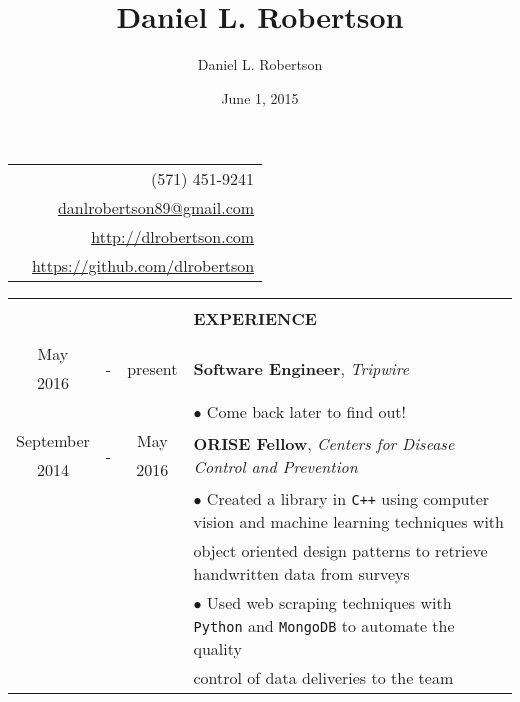 \documentclass[10pt]{article}
\title{Daniel L. Robertson}
\date{June 1, 2015}
\author{Daniel L. Robertson}
\begin{document}
    \normalfont
    \begin{table}[ht]
        \begin{tabular}{p{13cm}r}
            \multirow{4}{*}{\hspace*{1cm}\color{maroon}{\huge\textbf{Daniel L. Robertson}}} & (571) 451-9241\\
            & \href{mailto:danlrobertson89@gmail.com}{danlrobertson89@gmail.com}\\
            & \href{http://dlrobertson.com}{http://dlrobertson.com}\\
            & \href{https://github.com/dlrobertson}{https://github.com/dlrobertson}\\
        \end{tabular}
        \begin{tabular}{@{\hspace{0mm}}c@{\hspace{1mm}}c@{\hspace{3mm}}cl}
            & & & \color{maroon}{\rule{14cm}{0.75pt}}\\
            & & & \large{\textbf{EXPERIENCE}}\\[-2mm]
            & & & \color{maroon}{\rule{14cm}{0.75pt}}\\
            May & \multirow{2}{*}{-} & \multirow{2}{*}{present} & \multirow{2}{*}{\textbf{Software Engineer}, \textit{Tripwire}}\\
            2016 & & &\\
            & & & $\bullet$ Come back later to find out!\\
            September & \multirow{2}{*}{-} & May & \multirow{2}{*}{\textbf{ORISE Fellow}, \textit{Centers for Disease Control and Prevention}}\\
            2014 & & 2016 &\\
            & & & $\bullet$ Created a library in \texttt{C++} using computer vision and machine learning techniques with\\
            & & & \hspace*{4mm}object oriented design patterns to retrieve handwritten data from surveys\\
            & & & $\bullet$ Used web scraping techniques with \texttt{Python} and \texttt{MongoDB} to automate the quality\\
            & & & \hspace*{4mm}control of data deliveries to the team\\

\end{tabular}
\end{table}
\end{document}
